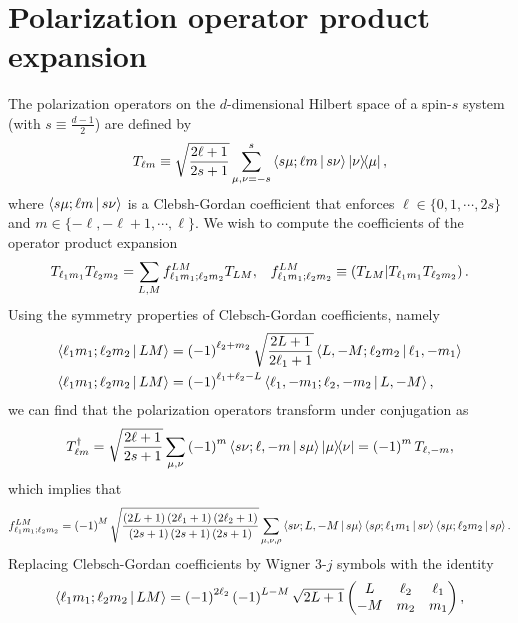 \documentclass[notitlepage,twocolumn]{revtex4-2}
\newcommand{\f}[2]{\dfrac{#1}{#2}} %
\newcommand{\p}[1]{\left(#1\right)} %
\newcommand{\bk}{\Braket} %
\renewcommand{\set}[1]{\{#1\}} %
\def\obk#1{\mathinner{({#1})}}
\begin{document}
\section{Polarization operator product expansion}
\label{sec:trans_prod}

The polarization operators on the $d$-dimensional Hilbert space of a spin-$s$ system (with $s\equiv\frac{d-1}{2}$) are defined by
\begin{align}
  T_{\ell m} \equiv \sqrt{\f{2\ell+1}{2s+1}} \sum_{\mu,\nu=-s}^s
  \bk{s\mu;\ell m|s\nu} \op{\nu}{\mu},
\end{align}
where $\bk{s\mu;\ell m|s\nu}$ is a Clebsh-Gordan coefficient that enforces $\ell\in\set{0,1,\cdots,2s}$ and $m\in\set{-\ell,-\ell+1,\cdots,\ell}$.
We wish to compute the coefficients of the operator product expansion
\begin{align}
  T_{\ell_1 m_1} T_{\ell_2 m_2}
  = \sum_{L,M} f_{\ell_1 m_1;\ell_2 m_2}^{LM} T_{LM},
  &&
  f_{\ell_1 m_1;\ell_2 m_2}^{LM}
  \equiv \obk{T_{LM} | T_{\ell_1 m_1} T_{\ell_2 m_2}}.
\end{align}
Using the symmetry properties of Clebsch-Gordan coefficients, namely
\begin{align}
  \bk{\ell_1 m_1; \ell_2 m_2| L M}
  &= \p{-1}^{\ell_2+m_2} \sqrt{\f{2L+1}{2\ell_1+1}}
  \bk{L,-M; \ell_2 m_2| \ell_1,-m_1} \\
  \bk{\ell_1 m_1; \ell_2 m_2| L M}
  &= \p{-1}^{\ell_1+\ell_2-L}
  \bk{\ell_1,-m_1; \ell_2,-m_2| L,-M},
\end{align}
we can find that the polarization operators transform under conjugation as
\begin{align}
  T_{\ell m}^\dag
  = \sqrt{\f{2\ell+1}{2s+1}}
  \sum_{\mu,\nu} \p{-1}^m \bk{s\nu;\ell,-m|s\mu} \op{\mu}{\nu}
  = \p{-1}^m T_{\ell,-m},
\end{align}
which implies that
\begin{align}
  f_{\ell_1 m_1;\ell_2 m_2}^{LM}
  = \p{-1}^M \sqrt{\f{\p{2L+1}\p{2\ell_1+1}\p{2\ell_2+1}}
    {\p{2s+1}\p{2s+1}\p{2s+1}}}
  \sum_{\mu,\nu,\rho} \bk{s\nu;L,-M|s\mu}
  \bk{s\rho;\ell_1m_1|s\nu} \bk{s\mu;\ell_2m_2|s\rho}.
\end{align}
Replacing Clebsch-Gordan coefficients by Wigner 3-$j$ symbols with the identity
\begin{align}
  \bk{\ell_1 m_1; \ell_2 m_2| L M}
  = \p{-1}^{2\ell_2} \p{-1}^{L-M} \sqrt{2L+1}
  \begin{pmatrix}
    L & \ell_2 & \ell_1 \\
    -M & m_2 & m_1
  \end{pmatrix},
\end{align}
\end{document}
